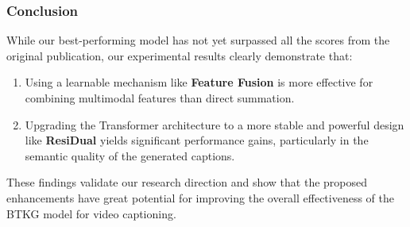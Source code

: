 \subsubsection{Conclusion}

While our best-performing model has not yet surpassed all the scores from the original publication, our experimental results clearly demonstrate that:

\begin{enumerate}
    \item Using a learnable mechanism like \textbf{Feature Fusion} is more effective for combining multimodal features than direct summation.
    
    \item Upgrading the Transformer architecture to a more stable and powerful design like \textbf{ResiDual} yields significant performance gains, particularly in the semantic quality of the generated captions.
\end{enumerate}

These findings validate our research direction and show that the proposed enhancements have great potential for improving the overall effectiveness of the BTKG model for video captioning.
